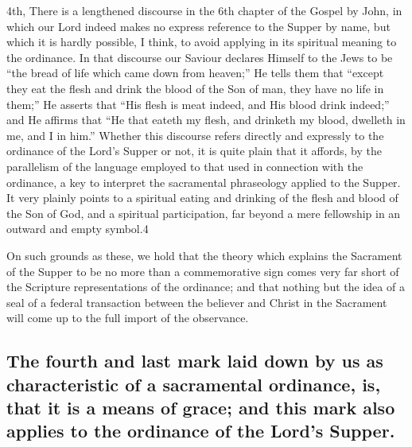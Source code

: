 \documentclass[]{book}
\begin{document}
4th, There is a lengthened discourse in the 6th chapter of the Gospel by John, in which our Lord indeed makes no express reference to the Supper by name, but which it is hardly possible, I think, to avoid applying in its spiritual meaning to the ordinance. In that discourse our Saviour declares Himself to the Jews to be ``the bread of life which came down from heaven;'' He tells them that ``except they eat the flesh and drink the blood of the Son of man, they have no life in them;'' He asserts that ``His flesh is meat indeed, and His blood drink indeed;'' and He affirms that ``He that eateth my flesh, and drinketh my blood, dwelleth in me, and I in him.'' Whether this discourse refers directly and expressly to the ordinance of the Lord's Supper or not, it is quite plain that it affords, by the parallelism of the language employed to that used in connection with the ordinance, a key to interpret the sacramental phraseology applied to the Supper. It very plainly points to a spiritual eating and drinking of the flesh and blood of the Son of God, and a spiritual participation, far beyond a mere fellowship in an outward and empty symbol.4

On such grounds as these, we hold that the theory which explains the Sacrament of the Supper to be no more than a commemorative sign comes very far short of the Scripture representations of the ordinance; and that nothing but the idea of a seal of a federal transaction between the believer and Christ in the Sacrament will come up to the full import of the observance.

\hypertarget{the-fourth-and-last-mark-laid-down-by-us-as-characteristic-of-a-sacramental-ordinance-is-that-it-is-a-means-of-grace-and-this-mark-also-applies-to-the-ordinance-of-the-lords-supper.}{%
\subsection{The fourth and last mark laid down by us as characteristic of a sacramental ordinance, is, that it is a means of grace; and this mark also applies to the ordinance of the Lord's Supper.}\label{the-fourth-and-last-mark-laid-down-by-us-as-characteristic-of-a-sacramental-ordinance-is-that-it-is-a-means-of-grace-and-this-mark-also-applies-to-the-ordinance-of-the-lords-supper.}}
\end{document}
